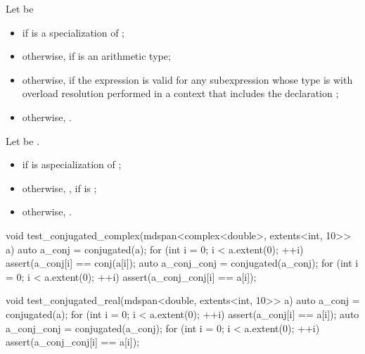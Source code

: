 \begin{itemdescr}
\pnum
Let  be
\begin{itemize}
\item
{}
if  is a specialization of ;
\item
otherwise,
 if  is an arithmetic type;
\item
otherwise,
if the expression  is valid for any subexpression 
whose type is 
with overload resolution performed in a context that includes the declaration
;
\item
otherwise,
.
\end{itemize}

\pnum
\returns
Let  be .
\begin{itemize}
\item
{}
if  is a\newline specialization of ;
\item
otherwise,
, if  is ;
\item
otherwise,
.
\end{itemize}
\end{itemdescr}

\pnum
\begin{example}
\begin{codeblock}
void test_conjugated_complex(mdspan<complex<double>, extents<int, 10>> a) {
  auto a_conj = conjugated(a);
  for (int i = 0; i < a.extent(0); ++i) {
    assert(a_conj[i] == conj(a[i]);
  }
  auto a_conj_conj = conjugated(a_conj);
  for (int i = 0; i < a.extent(0); ++i) {
    assert(a_conj_conj[i] == a[i]);
  }
}

void test_conjugated_real(mdspan<double, extents<int, 10>> a) {
  auto a_conj = conjugated(a);
  for (int i = 0; i < a.extent(0); ++i) {
    assert(a_conj[i] == a[i]);
  }
  auto a_conj_conj = conjugated(a_conj);
  for (int i = 0; i < a.extent(0); ++i) {
    assert(a_conj_conj[i] == a[i]);
  }
}
\end{codeblock}
\end{example}

